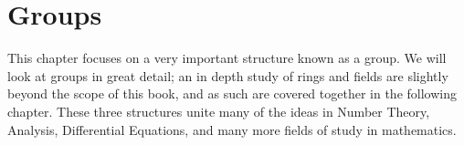 \chapter{Groups}

This chapter focuses on a very important structure known as a group. We will look at groups in great detail; an in depth study of rings and fields are slightly beyond the scope of this book, and as such are covered together in the following chapter. These three structures unite many of the ideas in Number Theory, Analysis, Differential Equations, and many more fields of study in mathematics.








